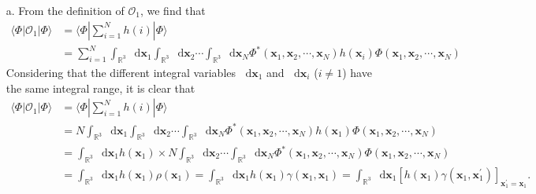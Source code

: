 \documentclass[a4paper]{book}
\newcounter{solution}[chapter]
\newcommand*{\dif}{\mathop{}\!\mathrm{d}}
\begin{document}
	\begin{solution}
	
	\begin{itemize}
	
	\item[a.] From the definition of $\mathscr{O}_1$, we find that	
	\begin{align*}
		\langle \Phi | \mathscr{O}_1 | \Phi \rangle &= \langle \Phi | \sum_{ i=1 }^N h(i) | \Phi \rangle \\
		&= \sum_{ i=1 }^N \int_{ \mathbb{R}^3 } \dif \boldsymbol{x}_1 \int_{ \mathbb{R}^3 } \dif \boldsymbol{x}_2 \cdots \int_{ \mathbb{R}^3 } \dif \boldsymbol{x}_N \Phi^*( \boldsymbol{x}_1, \boldsymbol{x}_2, \cdots , \boldsymbol{x}_N ) h( \boldsymbol{x}_i ) \Phi( \boldsymbol{x}_1, \boldsymbol{x}_2, \cdots , \boldsymbol{x}_N )
	\end{align*}
	Considering that the different integral variables $\dif \boldsymbol{x}_1$ and $\dif \boldsymbol{x}_i$ ($i \neq 1$) have the same integral range, it is clear that	
	\begin{align*}
		\langle \Phi | \mathscr{O}_1 | \Phi \rangle &= \langle \Phi | \sum_{ i=1 }^N h(i) | \Phi \rangle \\
		&= N \int_{ \mathbb{R}^3 } \dif \boldsymbol{x}_1 \int_{ \mathbb{R}^3 } \dif \boldsymbol{x}_2 \cdots \int_{ \mathbb{R}^3 } \dif \boldsymbol{x}_N \Phi^*( \boldsymbol{x}_1, \boldsymbol{x}_2, \cdots , \boldsymbol{x}_N ) h( \boldsymbol{x}_1 ) \Phi( \boldsymbol{x}_1, \boldsymbol{x}_2, \cdots , \boldsymbol{x}_N ) \\
		&= \int_{ \mathbb{R}^3 } \dif \boldsymbol{x}_1 h( \boldsymbol{x}_1 ) \times N \int_{ \mathbb{R}^3 } \dif \boldsymbol{x}_2 \cdots \int_{ \mathbb{R}^3 } \dif \boldsymbol{x}_N \Phi^*( \boldsymbol{x}_1, \boldsymbol{x}_2, \cdots , \boldsymbol{x}_N ) \Phi( \boldsymbol{x}_1, \boldsymbol{x}_2, \cdots , \boldsymbol{x}_N ) \\
		&= \int_{ \mathbb{R}^3 } \dif \boldsymbol{x}_1 h( \boldsymbol{x}_1 ) \rho( \boldsymbol{x}_1 ) = \int_{ \mathbb{R}^3 } \dif \boldsymbol{x}_1 h( \boldsymbol{x}_1 ) \gamma( \boldsymbol{x}_1 , \boldsymbol{x}_1 ) = \int_{ \mathbb{R}^3 } \dif \boldsymbol{x}_1 \left[ h( \boldsymbol{x}_1 ) \gamma( \boldsymbol{x}_1 , \boldsymbol{x}^\prime_1 ) \right]_{ \boldsymbol{x}^\prime_1 = \boldsymbol{x}_1 }.
	\end{align*}
		

\end{itemize}
\end{solution}
\end{document}
